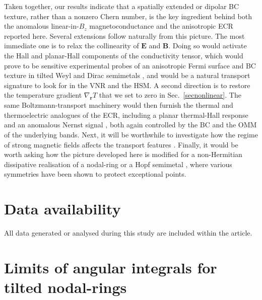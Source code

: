 \documentclass[aps,prb,onecolumn,nofootinbib,citeautoscript,10pt]{revtex4-2}
\newcommand{\bs}[1]{\boldsymbol{#1}}
\begin{document}
Taken together, our results indicate that a spatially extended or dipolar BC texture, rather than a nonzero Chern number, is the key ingredient behind both the anomalous linear-in-$B_z$ magnetoconductance and the anisotropic ECR reported here. Several extensions follow naturally from this picture. The most immediate one is to relax the collinearity of $\bs E$ and $\bs B$. Doing so would activate the Hall and planar-Hall components of the conductivity tensor, which would prove to be sensitive experimental probes of an anisotropic Fermi surface and BC texture in tilted Weyl and Dirac semimetals \cite{burkov17_giant, ma19_planar, li18_giant}, and would be a natural transport signature to look for in the VNR and the HSM. A second direction is to restore the temperature gradient $\nabla_{\bs r} T$ that we set to zero in Sec.~\ref{secnonlinear}. The same Boltzmann-transport machinery would then furnish the thermal and thermoelectric analogues of the ECR, including a planar thermal-Hall response \cite{nandy_thermal_hall, ips-ruiz, ips-spin1-ph, ips-rsw-ph} and an anomalous Nernst signal \cite{watzman18_dirac}, both again controlled by the BC and the OMM of the underlying bands.
Next, it will be worthwhile to investigate how the regime of strong magnetic fields affects the transport features \cite{gusynin06_magneto, yadav23_magneto, dirac-qtm, deng2019_quantum, ips-sanskar-2dgnr}. Finally, it would be worth asking how the picture developed here is modified for a non-Hermitian dissipative realisation of a nodal-ring or a Hopf semimetal \cite{ips-hessen}, where various symmetries have been shown to protect exceptional points.

\section*{Data availability}

All data generated or analysed during this study are included within the article.



\appendix



\section{Limits of angular integrals for tilted nodal-rings}
\label{appcyclides}
\end{document}
